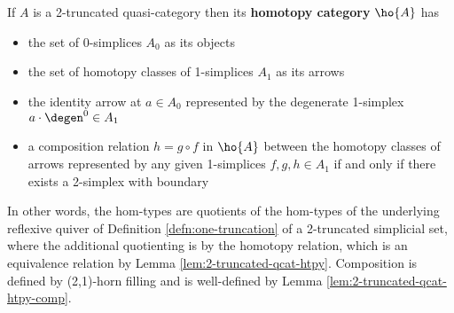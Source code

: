\begin{definition}\label{defn:2-truncated-qcat-htpy-cat}

  If $A$ is a 2-truncated quasi-category then its \textbf{homotopy category} $\ho{A}$ has
  \begin{itemize}
  \item the set of 0-simplices $A_0$ as its objects
  \item the set of homotopy classes of 1-simplices $A_1$ as its arrows
  \item the identity arrow at $a \in A_0$ represented by the degenerate 1-simplex $a \cdot \degen^0 \in A_1$
  \item a composition relation $h = g \circ f$ in $\ho{A}$ between the homotopy classes of arrows represented by any given 1-simplices $f,g,h \in A_1$ if and only if there exists a 2-simplex with boundary
  \begin{center}
  \end{center}
  \end{itemize}
\end{definition}

In other words, the hom-types are quotients of the hom-types of the underlying reflexive quiver of Definition \ref{defn:one-truncation} of a 2-truncated simplicial set, where the additional quotienting is by the homotopy relation, which is an equivalence relation by Lemma \ref{lem:2-truncated-qcat-htpy}. Composition is defined by (2,1)-horn filling and is well-defined by Lemma \ref{lem:2-truncated-qcat-htpy-comp}.

